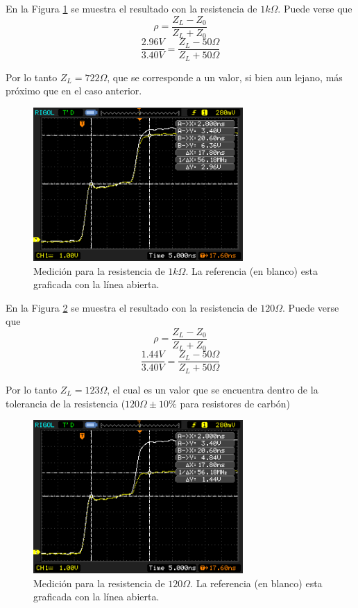 \documentclass[a4paper,10pt]{article}
\begin{document}
	\indent En la Figura \ref{img002} se muestra el resultado con la 
	resistencia de $1k\Omega$. Puede verse que 
	$$\rho=\frac{Z_L-Z_0}{Z_L+Z_0}$$
	$$\frac{2.96V}{3.40V}=\frac{Z_L- 50\Omega}{Z_L+50\Omega}$$
	
	\indent Por lo tanto $Z_L=722\Omega$, que se corresponde a un valor, si 
	bien aun lejano, m\'as pr\'oximo que en el caso anterior.
		
		\begin{figure}[!htb]
			\centering
			\includegraphics[width=8cm]
			{Imagenes/Res1k.png}
			\caption{Medici\'on para la resistencia de $1k\Omega$. La 
			referencia (en blanco) esta graficada con la l\'inea abierta.}
			\label{img002} 
		\end{figure}

	\indent En la Figura \ref{img003} se muestra el resultado con la 
	resistencia de $120\Omega$. Puede verse que 
	$$\rho=\frac{Z_L-Z_0}{Z_L+Z_0}$$
	$$\frac{1.44V}{3.40V}=\frac{Z_L- 50\Omega}{Z_L+50\Omega}$$
	
	\indent Por lo tanto $Z_L=123\Omega$, el cual es un valor que se encuentra
	dentro de la tolerancia de la resistencia ($120\Omega \pm 10\%$
	para resistores de carb\'on)	

		\begin{figure}[!htb]
			\centering
			\includegraphics[width=8cm]
			{Imagenes/Res120.png}
			\caption{Medici\'on para la resistencia de $120\Omega$. La 
			referencia (en blanco) esta graficada con la l\'inea abierta.}
			\label{img003}
		\end{figure}
	
\end{document}
